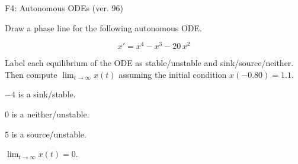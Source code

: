 \begin{exercise}
  \begin{exerciseTitle}F4: Autonomous ODEs (ver. 96)\end{exerciseTitle}
  \begin{exerciseStatement}
    

      Draw a phase line for the following 
      autonomous ODE.
    

    
\[x'= x^{4} - x^{3} - 20 \, x^{2}\]

    

      Label each equilibrium of the ODE
      as stable/unstable and sink/source/neither.
      Then compute \(\lim_{t\to\infty}x(t)\)
      assuming the initial condition
      \(x( -0.80 )= 1.1\).
    

  \end{exerciseStatement}
  \begin{exerciseAnswer}
    

      \(-4\) is a sink/stable.
      
        \(0\) is a neither/unstable.
      
      \(5\) is a source/unstable.
    

    

      \(\lim_{t\to\infty}x(t)=0\).
    

  \end{exerciseAnswer}
\end{exercise}